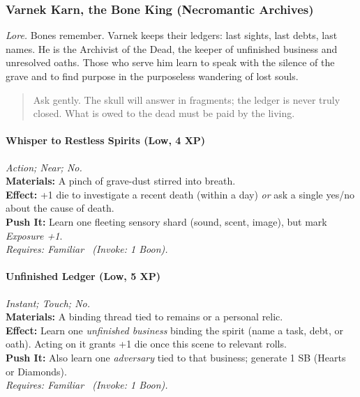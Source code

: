
\subsubsection{Varnek Karn, the Bone King (Necromantic Archives)}
\textit{Lore.} Bones remember. Varnek keeps their ledgers: last sights, last debts, last names. He is the Archivist of the Dead, the keeper of unfinished business and unresolved oaths. Those who serve him learn to speak with the silence of the grave and to find purpose in the purposeless wandering of lost souls.

\begin{quote}
Ask gently. The skull will answer in fragments; the ledger is never truly closed. What is owed to the dead must be paid by the living.
\end{quote}

\paragraph{Whisper to Restless Spirits (Low, 4 XP)} \emph{Action; Near; No.}\\
\textbf{Materials:} A pinch of grave-dust stirred into breath.\\
\textbf{Effect:} +1 die to investigate a recent death (within a day) \emph{or} ask a single yes/no about the cause of death.\\
\textbf{Push It:} Learn one fleeting sensory shard (sound, scent, image), but mark \emph{Exposure +1}.\\
\emph{Requires: Familiar \ (\textit{Invoke:} 1 Boon).}

\paragraph{Unfinished Ledger (Low, 5 XP)} \emph{Instant; Touch; No.}\\
\textbf{Materials:} A binding thread tied to remains or a personal relic.\\
\textbf{Effect:} Learn one \emph{unfinished business} binding the spirit (name a task, debt, or oath). Acting on it grants +1 die once this scene to relevant rolls.\\
\textbf{Push It:} Also learn one \emph{adversary} tied to that business; generate 1 SB (Hearts or Diamonds).\\
\emph{Requires: Familiar \ (\textit{Invoke:} 1 Boon).}

